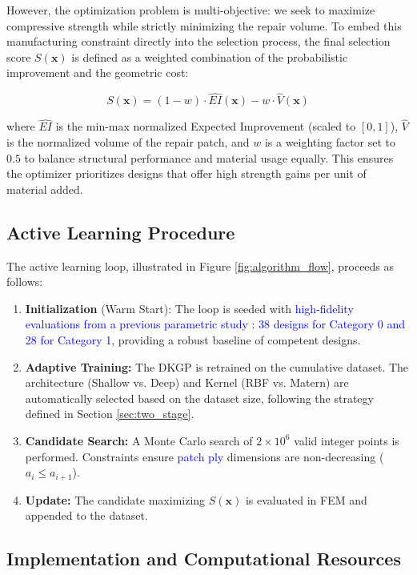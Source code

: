 \documentclass[
  preprint,
  12pt,
  a4paper
]{elsarticle}
\newcommand{\new}[1]{\textcolor{blue}{#1}}
\begin{document}
However, the optimization problem is multi-objective: we seek to maximize compressive strength while strictly minimizing the repair volume. To embed this manufacturing constraint directly into the selection process, the final selection score $S(\mathbf{x})$ is defined as a weighted combination of the probabilistic improvement and the geometric cost:

\begin{equation}
    S(\mathbf{x}) = (1 - w) \cdot \widehat{EI}(\mathbf{x}) - w \cdot \widehat{V}(\mathbf{x})
\end{equation}

where $\widehat{EI}$ is the min-max normalized Expected Improvement (scaled to $[0,1]$), $\widehat{V}$ is the normalized volume of the repair patch, and $w$ is a weighting factor set to $0.5$ to balance structural performance and material usage equally. This ensures the optimizer prioritizes designs that offer high strength gains per unit of material added.

\subsection{Active Learning Procedure}
The active learning loop, illustrated in Figure \ref{fig:algorithm_flow}, proceeds as follows:

\begin{enumerate}
    \item \textbf{Initialization} (Warm Start): The loop is seeded with \new{high-fidelity evaluations from a previous parametric study \cite{psarras2024design}: 38 designs for Category 0 and 28 for Category 1,} providing a robust baseline of competent designs.
    \item \textbf{Adaptive Training:} The DKGP is retrained on the cumulative dataset. The architecture (Shallow vs. Deep) and Kernel (RBF vs. Matern) are automatically selected based on the dataset size, following the strategy defined in Section \ref{sec:two_stage}.
    \item \textbf{Candidate Search:} A Monte Carlo search of $2 \times 10^6$ valid integer points is performed. Constraints ensure \new{patch ply} dimensions are non-decreasing ($a_i \leq a_{i+1}$).
    \item \textbf{Update:} The candidate maximizing $S(\mathbf{x})$ is evaluated in FEM and appended to the dataset.
\end{enumerate}

\subsection{Implementation and Computational Resources}
\label{sec:implementation}
\end{document}
